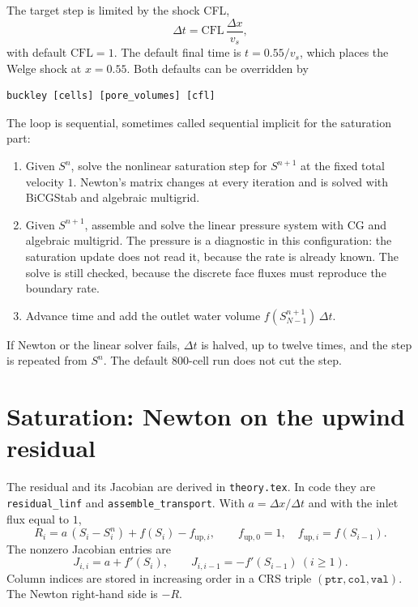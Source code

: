 \documentclass[11pt]{article}
\begin{document}
The target step is limited by the shock CFL,
\begin{equation}
\label{eq:cfl}
\Delta t = \mathrm{CFL}\,\frac{\Delta x}{v_s},
\end{equation}
with default $\mathrm{CFL}=1$.
The default final time is $t = 0.55/v_s$, which places the Welge shock at $x=0.55$.
Both defaults can be overridden by
\begin{lstlisting}
buckley [cells] [pore_volumes] [cfl]
\end{lstlisting}
The loop is sequential, sometimes called sequential implicit for the saturation part:
\begin{enumerate}
\item Given $S^n$, solve the nonlinear saturation step for $S^{n+1}$ at the fixed total velocity $1$.
Newton's matrix changes at every iteration and is solved with BiCGStab and algebraic multigrid.
\item Given $S^{n+1}$, assemble and solve the linear pressure system with CG and algebraic multigrid.
The pressure is a diagnostic in this configuration: the saturation update does not read it, because the rate is already known.
The solve is still checked, because the discrete face fluxes must reproduce the boundary rate.
\item Advance time and add the outlet water volume $f(S_{N-1}^{n+1})\,\Delta t$.
\end{enumerate}
If Newton or the linear solver fails, $\Delta t$ is halved, up to twelve times, and the step is repeated from $S^n$.
The default $800$-cell run does not cut the step.

\section{Saturation: Newton on the upwind residual}

The residual and its Jacobian are derived in \texttt{theory.tex}.
In code they are \texttt{residual\_linf} and \texttt{assemble\_transport}.
With $a = \Delta x/\Delta t$ and with the inlet flux equal to $1$,
\begin{equation}
\label{eq:R}
R_i = a\,(S_i - S_i^n) + f(S_i) - f_{\mathrm{up},i},
\qquad
f_{\mathrm{up},0} = 1,
\quad
f_{\mathrm{up},i} = f(S_{i-1}).
\end{equation}
The nonzero Jacobian entries are
\begin{equation}
\label{eq:J}
J_{i,i} = a + f'(S_i),
\qquad
J_{i,i-1} = -f'(S_{i-1})\ (i\ge 1).
\end{equation}
Column indices are stored in increasing order in a CRS triple $(\mathtt{ptr}, \mathtt{col}, \mathtt{val})$.
The Newton right-hand side is $-R$.
\end{document}

